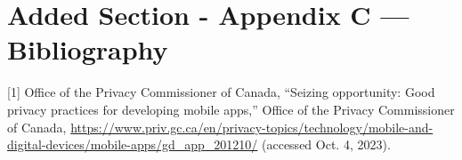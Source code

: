 \documentclass[12pt]{article}
\begin{document}
\section*{Added Section - Appendix C --- Bibliography}

[1] Office of the Privacy Commissioner of Canada, “Seizing opportunity: Good privacy practices for developing mobile apps,” Office of the Privacy Commissioner of Canada, \url{https://www.priv.gc.ca/en/privacy-topics/technology/mobile-and-digital-devices/mobile-apps/gd_app_201210/} (accessed Oct. 4, 2023). 
\end{document}
